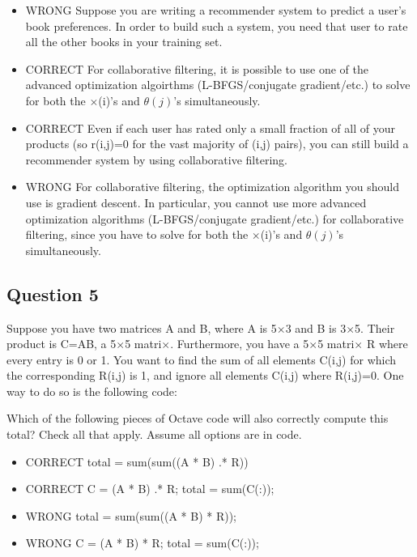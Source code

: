 \documentclass[11pt]{article} %
\begin{document}
\begin{itemize}

\item WRONG Suppose you are writing a recommender system to predict a user's book preferences. In order to build such a system, you need that user to rate all the other books in your training set.

\item CORRECT For collaborative filtering, it is possible to use one of the advanced optimization algoirthms (L-BFGS/conjugate gradient/etc.) to solve for both the $ \times $(i)'s and $\theta(j)$'s simultaneously.

\item CORRECT Even if each user has rated only a small fraction of all of your products (so r(i,j)=0 for the vast majority of (i,j) pairs), you can still build a recommender system by using collaborative filtering.

\item WRONG For collaborative filtering, the optimization algorithm you should use is gradient descent. In particular, you cannot use more advanced optimization algorithms (L-BFGS/conjugate gradient/etc.) for collaborative filtering, since you have to solve for both the $ \times $(i)'s and $\theta(j)$'s simultaneously.

\end{itemize}


\subsection*{Question 5 } 

Suppose you have two matrices A and B, where A is 5$ \times $3 and B is 3$ \times $5. Their product is C=AB, a 5$ \times $5 matri$ \times $. Furthermore, you have a 5$ \times $5 matri$ \times $ R where every entry is 0 or 1. You want to find the sum of all elements C(i,j) for which the corresponding R(i,j) is 1, and ignore all elements C(i,j) where R(i,j)=0. One way to do so is the following code:


Which of the following pieces of Octave code will also correctly compute this total? Check all that apply. Assume all options are in code.

\begin{itemize}

\item CORRECT total = sum(sum((A * B) .* R))

\item CORRECT C = (A * B) .* R; total = sum(C(:));

\item WRONG total = sum(sum((A * B) * R));

\item WRONG C = (A * B) * R; total = sum(C(:));
\end{itemize}
\end{document}

